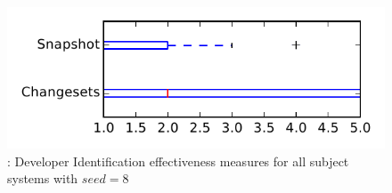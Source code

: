 
\begin{figure}
\centering
\includegraphics[height=0.4\textheight]{figures/dit_seed/rq1_tiny_8}
\caption{\rtwo: Developer Identification effectiveness measures for all subject systems with $seed=8$}
\label{fig:dit_seed:rq1:tiny}
\end{figure}
